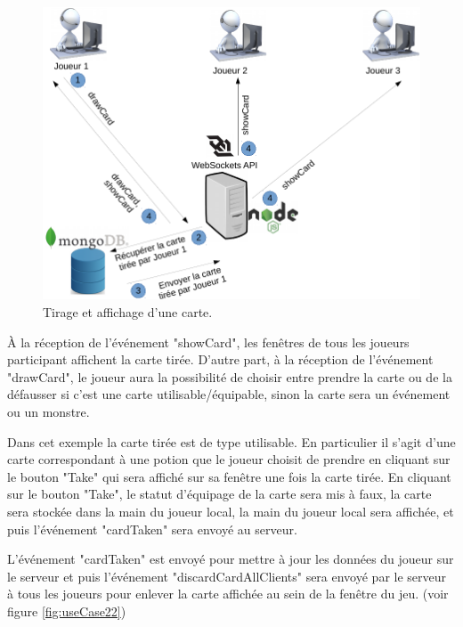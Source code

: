 \documentclass[12pt]{report}
\begin{document}
			\begin{figure}[h!]
		  	\centering
		    \includegraphics[scale=0.5]{images/useCase21.png}
		    \caption{Tirage et affichage d'une carte.}
				\label{fig:useCase21}
		  \end{figure}

			À la réception de l'événement "showCard", les fenêtres de tous les joueurs participant affichent la carte tirée. D'autre part, à la réception de l'événement "drawCard", le joueur aura la possibilité de choisir entre prendre la carte ou de la défausser si c'est une carte utilisable/équipable, sinon la carte sera un événement ou un monstre.

			Dans cet exemple la carte tirée est de type utilisable. En particulier il s'agit d'une carte correspondant à une potion que le joueur choisit de prendre en cliquant sur le bouton "Take" qui sera affiché sur sa fenêtre une fois la carte tirée. En cliquant sur le bouton "Take", le statut d'équipage de la carte sera mis à faux, la carte sera stockée dans la main du joueur local, la main du joueur local sera affichée, et puis l'événement "cardTaken" sera envoyé au serveur.

			L'événement "cardTaken" est envoyé pour mettre à jour les données du joueur sur le serveur et puis l'événement "discardCardAllClients" sera envoyé par le serveur à tous les joueurs pour enlever la carte affichée au sein de la fenêtre du jeu. (voir figure \ref{fig:useCase22})
\end{document}
